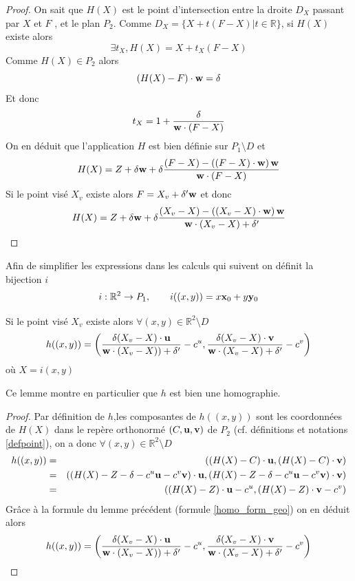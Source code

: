 \begin{proof}
On sait que $H(X)$ est le point d'intersection entre la droite $D_X$ passant par $X$ et $F$ , et le plan $P_2$.
Comme $D_{X}=\{X+t(F-X)|t\in\mathbb{R}\}$, si $H(X)$ existe alors 
\begin{equation*}
\exists t_{X},H(X)=X+t_{X}(F-X)
\end{equation*}
Comme $H(X)\in P_{2}$ alors
\begin{equation*}
(H(X)-F)\cdot \mathbf{w} =\delta
\end{equation*}
Et donc 
\begin{equation*}
t_{X}=1+\frac{\delta}{\mathbf{w} \cdot(F-X)}
\end{equation*}
 On en déduit que l'application $H$ est bien définie sur $P_{1}\setminus D$ et 
\begin{equation*}
H(X)=Z+\delta \mathbf{w}+\delta \frac{(F-X)-\left((F-X)\cdot \mathbf{w} \right) \mathbf{w}}{\mathbf{w} \cdot (F-X)}
\end{equation*}
Si le point visé $X_v$ existe alors  $F=X_v+\delta' \mathbf{w}$ et donc
\begin{equation*}
H(X)=Z+\delta \mathbf{w}+\delta \frac{(X_v-X)-\left((X_v-X)\cdot \mathbf{w} \right) \mathbf{w}}{\mathbf{w} \cdot (X_v-X)+\delta'}
\end{equation*}
\end{proof}
Afin de simplifier les expressions dans les calculs qui suivent on définit la bijection $i$ 
\begin{equation*}
i:\mathbb{R}^{2}\rightarrow P_{1},~~~~~~i((x,y))=x\mathbf{x}_{0}+y\mathbf{y}_{0}
\end{equation*}

\begin{lem}Si le point visé $X_v$ existe alors $\forall (x,y)\in \mathbb{R}^{2} \setminus D$ 
\begin{equation}
h((x,y))=\left(\frac{\delta (X_{v}-X)\cdot \mathbf{u}}{\mathbf{w} \cdot (X_v-X))+\delta'}-c^u,\frac{\delta (X_v-X)\cdot \mathbf{v}}{\mathbf{w} \cdot (X_v-X)+\delta'} -c^v \right) 
\label{homo_form_analytique}
\end{equation}
où $X=i(x,y)$
\end{lem}
Ce lemme montre en particulier que $h$ est bien une homographie.
\begin{proof}
Par définition de $h$,les composantes de $h((x,y))$ sont les coordonnées de $H(X)$ dans le repère orthonormé $(C,\mathbf{u},\mathbf{v})$ de $P_2$ (cf. définitions et notations \ref{defpoint}), on a donc $ \forall (x,y)\in \mathbb{R}^{2} \setminus D$
\begin{eqnarray*}
h((x,y)) &=& ((H(X)-C)\cdot \mathbf{u}, (H(X)-C)\cdot \mathbf{v})\\
     &=& ((H(X)-Z-\delta -c^u \mathbf{u} -c^v \mathbf{v})\cdot \mathbf{u}, (H(X)-Z-\delta -c^u \mathbf{u} -c^v \mathbf{v})\cdot \mathbf{v})\\
     &=& ((H(X)-Z)\cdot \mathbf{u} -c^u, (H(X)-Z)\cdot \mathbf{v} - c^v)
\end{eqnarray*}
Grâce à la formule du lemme précédent (formule \ref{homo_form_geo}) on en déduit alors 
\begin{equation*}
h((x,y))=\left(\frac{\delta (X_v-X)\cdot \mathbf{u}}{\mathbf{w} \cdot (X_v-X))+\delta'}-c^u,\frac{\delta (X_v-X)\cdot \mathbf{v}}{\mathbf{w} \cdot (X_v-X)+\delta'} -c^v \right) 
\end{equation*}
\end{proof}

